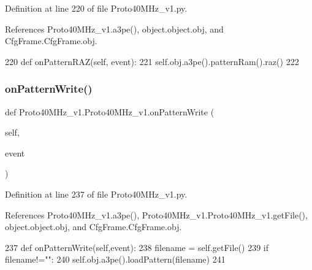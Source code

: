 Definition at line 220 of file Proto40\+M\+Hz\+\_\+v1.\+py.



References Proto40\+M\+Hz\+\_\+v1.\+a3pe(), object.\+object.\+obj, and Cfg\+Frame.\+Cfg\+Frame.\+obj.


\begin{DoxyCode}
220     \textcolor{keyword}{def }onPatternRAZ(self, event):
221         self.obj.a3pe().patternRam().raz()
222 
\end{DoxyCode}
\mbox{\label{classProto40MHz__v1_1_1Proto40MHz__v1_a1e9aa581b003b51a6f9b532d69734202}} 
\subsubsection{\texorpdfstring{on\+Pattern\+Write()}{onPatternWrite()}}
{\footnotesize\ttfamily def Proto40\+M\+Hz\+\_\+v1.\+Proto40\+M\+Hz\+\_\+v1.\+on\+Pattern\+Write (\begin{DoxyParamCaption}\item[{}]{self,  }\item[{}]{event }\end{DoxyParamCaption})}



Definition at line 237 of file Proto40\+M\+Hz\+\_\+v1.\+py.



References Proto40\+M\+Hz\+\_\+v1.\+a3pe(), Proto40\+M\+Hz\+\_\+v1.\+Proto40\+M\+Hz\+\_\+v1.\+get\+File(), object.\+object.\+obj, and Cfg\+Frame.\+Cfg\+Frame.\+obj.


\begin{DoxyCode}
237     \textcolor{keyword}{def }onPatternWrite(self,event):
238         filename = self.getFile()
239         \textcolor{keywordflow}{if} filename!=\textcolor{stringliteral}{""}:
240             self.obj.a3pe().loadPattern(filename)
241         
\end{DoxyCode}
\mbox{\label{classProto40MHz__v1_1_1Proto40MHz__v1_a3c0faa924421f2dc50101373a7d144b9}} 
